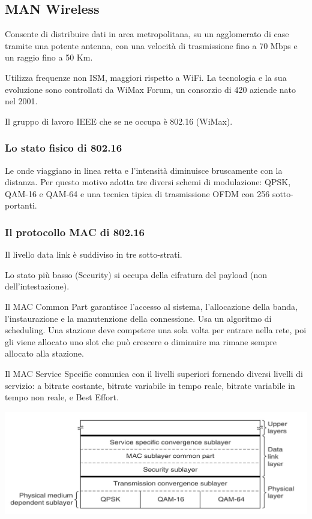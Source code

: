     \subsection{MAN Wireless}
        Consente di distribuire dati in area metropolitana, su un agglomerato di case tramite una potente antenna, con una velocità di trasmissione fino a 70 Mbps e un raggio fino a 50 Km.
    
        Utilizza frequenze non ISM, maggiori rispetto a WiFi. La tecnologia e la sua evoluzione sono controllati da WiMax Forum, un consorzio di 420 aziende nato nel 2001.
    
        Il gruppo di lavoro IEEE che se ne occupa è 802.16 (WiMax).

        \subsubsection{Lo stato fisico di 802.16}
            Le onde viaggiano in linea retta e l'intensità diminuisce bruscamente con la distanza. Per questo motivo adotta tre diversi schemi di modulazione: QPSK, QAM-16 e QAM-64 e una tecnica tipica di trasmissione OFDM con 256 sotto-portanti.

        \subsubsection{Il protocollo MAC di 802.16}
            Il livello data link è suddiviso in tre sotto-strati.
            
            Lo stato più basso (Security) si occupa della cifratura del payload (non dell'intestazione).
        
            Il MAC Common Part garantisce l'accesso al sistema, l'allocazione della banda, l'instaurazione e la manutenzione della connessione. Usa un algoritmo di scheduling. Una stazione deve competere una sola volta per entrare nella rete, poi gli viene allocato uno slot che può crescere o diminuire ma rimane sempre allocato alla stazione.

            Il MAC Service Specific comunica con il livelli superiori fornendo diversi livelli di servizio: a bitrate costante, bitrate variabile in tempo reale, bitrate variabile in tempo non reale, e Best Effort.

            \begin{center}
                \includegraphics[scale=0.338]{chapters/3/assets/schema_z.png}
            \end{center}

